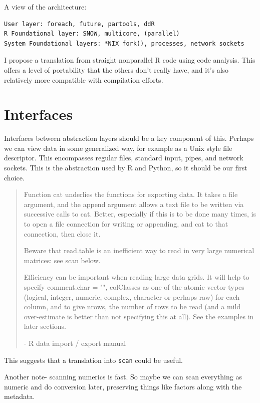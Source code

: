 \documentclass[12pt]{article}
\begin{document}
A view of the architecture:

\begin{verbatim}
User layer: foreach, future, partools, ddR
R Foundational layer: SNOW, multicore, (parallel)
System Foundational layers: *NIX fork(), processes, network sockets
\end{verbatim}

I propose a translation from straight nonparallel R code using code
analysis. This offers a level of portability that the others don't really
have, and it's also relatively more compatible with compilation efforts.

\section{Interfaces}

Interfaces between abstraction layers should be a key component of this.
Perhaps we can view data in some generalized way, for example as a Unix
style file descriptor. This encompasses regular files, standard input,
pipes, and network sockets. This is the abstraction used by R and Python,
so it should be our first choice.

\begin{quote}

Function cat underlies the functions for exporting data. It takes a file
    argument, and the append argument allows a text file to be written via
    successive calls to cat. Better, especially if this is to be done many
    times, is to open a file connection for writing or appending, and cat
    to that connection, then close it.

Beware that read.table is an inefficient way to read in very large
numerical matrices: see scan below.

Efficiency can be important when reading large data grids. It will help to
    specify comment.char = "", colClasses as one of the atomic vector types
    (logical, integer, numeric, complex, character or perhaps raw) for each
    column, and to give nrows, the number of rows to be read (and a mild
    over-estimate is better than not specifying this at all). See the
    examples in later sections.

- R data import / export manual
\end{quote}

This suggests that a translation into \texttt{scan} could be useful.

Another note- scanning numerics is fast. So maybe we can scan everything as
numeric and do conversion later, preserving things like factors along with
the metadata.
\end{document}
